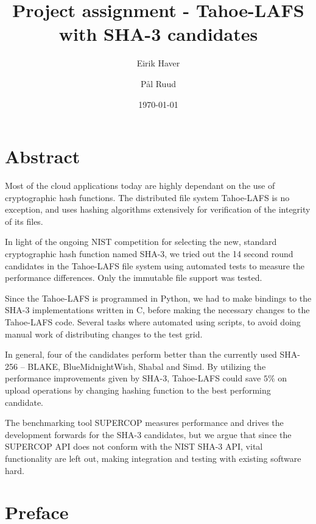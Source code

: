 \documentclass[english,12pt,a4paper]{book}
\author{Eirik Haver \and Pål Ruud}
\title{Project assignment - Tahoe-LAFS with SHA-3 candidates}
\date{\today}
\begin{document}

\pagestyle{empty}

\chapter*{Abstract}
\pagestyle{plain}
\setcounter{page}{1}

%

Most of the cloud applications today are highly dependant on the use of
cryptographic hash functions. The distributed file system Tahoe-LAFS is no
exception, and uses hashing algorithms extensively for verification of the
integrity of its files.

In light of the ongoing NIST competition for selecting the new, standard
cryptographic hash function named SHA-3, we tried out the 14 second
round candidates in the Tahoe-LAFS file system using automated tests to measure
the performance differences. Only the immutable file support was tested.

Since the Tahoe-LAFS is programmed in Python, we had to make bindings to the
SHA-3 implementations written in C, before making the necessary changes to the
Tahoe-LAFS code. Several tasks where automated using scripts, to avoid doing
manual work of distributing changes to the test grid.

In general, four of the candidates perform better than the currently used
SHA-256 -- BLAKE, BlueMidnightWish, Shabal and Simd.
By utilizing the performance improvements given by SHA-3, Tahoe-LAFS could
save $5\%$ on upload operations by changing hashing function to the best
performing candidate.

The benchmarking tool SUPERCOP measures performance and drives the development
forwards for the SHA-3 candidates, but we argue that since the SUPERCOP API does
not conform with the NIST SHA-3 API, vital functionality are left out, making
integration and testing with existing software hard.

\chapter*{Preface}
\end{document}
